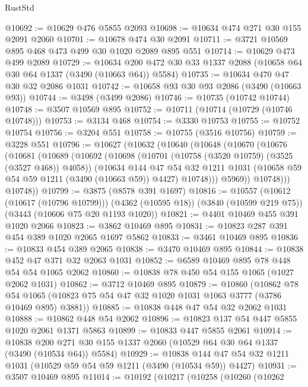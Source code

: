 \begin{lexlean}{RustStd}
\begin{coremodule}
{\begin{coremodule}
{{{{{{{{{{{{{{{{{{{{{{{{{{@10692 := @10629 @476 @5855 @2093
@10698 := @10634 @474 @271 @30 @155 @2091 @2060
@10701 := @10678 @474 @30 @2091
@10711 := @3721 @10569 @895 @468 @473 @499 @30 @1020 @2089 @895 @551
@10714 := @10629 @473 @499 @2089
@10729 := @10634 @200 @472 @30 @33 @1337 @2088 (@10658 @64 @30 @64 @1337 (@3490 (@10663 @64)) @5584)
@10735 := @10634 @470 @47 @30 @32 @2086 @1031
@10742 := @10658 @93 @30 @93 @2086 (@3490 (@10663 @93))
@10744 := @3498 (@3499 @2086)
@10746 := @10735 (@10742 @10744)
@10748 := @3507 @10569 @895
@10752 := @10711 (@10714 (@10729 (@10746 @10748)))
@10753 := @3134 @468
@10754 := @3330 @10753
@10755 := @10752 @10754
@10756 := @3204 @551
@10758 := @10755 (@3516 @10756)
@10759 := @3228 @551
@10796 := @10627
    (@10632
      (@10640
        (@10648
          (@10670
            (@10676
              (@10681
                (@10689
                  (@10692
                    (@10698
                      (@10701 (@10758 (@3520 @10759) (@3525 (@3527 @468)) @4058))
                      (@10634
                        @144
                        @47
                        @54
                        @32
                        @1211
                        @1031
                        (@10658 @59 @54 @59 @1211 (@3490 (@10663 @59)) @4427)
                        @10748)))
                  @5969))
              @10748)))
        @10748))
@10799 := @3875 (@8578 @391 @1697)
@10816 := @10557
    (@10612 (@10617 (@10796 @10799)))
    (@4362 (@10595 @18))
    (@3840 (@10599 @219 @75))
    (@3443 (@10606 @75 @20 @1193 @1020))
@10821 := @4401 @10469 @455 @391 @1020 @2066
@10823 := @3862 @10469 @895
@10831 := @10823 @287 @391 @454 @389 @1020 @2065 @1697 @5862
@10833 := @3461 @10469 @895
@10836 := @10833 @454 @389 @2065
@10838 := @3470 @10469 @895
@10844 := @10838 @452 @47 @371 @32 @2063 @1031
@10852 := @6589 @10469 @895 @78 @448 @54 @54 @1065 @2062
@10860 := @10838 @78 @450 @54 @155 @1065 (@1027 @2062 @1031)
@10862 := @3712 @10469 @895
@10879 := @10860
    (@10862
      @78
      @54
      @1065
      (@10823 @75 @54 @47 @32 @1020 @1031 @1063 @3777 (@3786 @10469 @895) @3881))
@10885 := @10838 @448 @47 @54 @32 @2062 @1031
@10888 := @10862 @448 @54 @2062
@10896 := @10823 @137 @54 @447 @5855 @1020 @2061 @1371 @5863
@10899 := @10833 @447 @5855 @2061
@10914 := @10838
    @200
    @271
    @30
    @155
    @1337
    @2060
    (@10529 @64 @30 @64 @1337 (@3490 (@10534 @64)) @5584)
@10929 := @10838 @144 @47 @54 @32 @1211 @1031 (@10529 @59 @54 @59 @1211 (@3490 (@10534 @59)) @4427)
@10931 := @3507 @10469 @895
@11014 := @10192
    (@10217
      (@10258
        (@10260
          (@10262
}}}}}}}}}}}}}}}}}}}}}}}}}}
\end{coremodule}}
\end{coremodule}
\end{lexlean}
